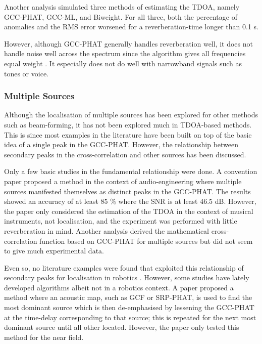 \documentclass{report}
\begin{document}
Another analysis \cite{brandstein_robust_1997} simulated three methods of estimating the TDOA, namely GCC-PHAT, GCC-ML, and Biweight. For all three, both the percentage of anomalies and the RMS error worsened for a reverberation-time longer than 0.1 \si{s}.

However, although GCC-PHAT generally handles reverberation well, it does not handle noise well across the spectrum since the algorithm gives all frequencies equal weight \cite{valin_robust_2003}. It especially does not do well with narrowband signals such as tones or voice.

\subsubsection{Multiple Sources}

Although the localisation of multiple sources has been explored for other methods such as beam-forming, it has not been explored much in TDOA-based methods. This is since most examples in the literature have been built on top of the basic idea of a single peak in the GCC-PHAT. However, the relationship between secondary peaks in the cross-correlation and other sources has been discussed.

Only a few basic studies in the fundamental relationship were done. A convention paper \cite{clifford_calculating_2010} proposed a method in the context of audio-engineering where multiple sources manifested themselves as distinct peaks in the GCC-PHAT. The results showed an accuracy of at least 85 \% where the SNR is at least 46.5 \si{dB}. However, the paper only considered the estimation of the TDOA in the context of musical instruments, not localisation, and the experiment was performed with little reverberation in mind. Another analysis \cite{kwon_analysis_2010} derived the mathematical cross-correlation function based on GCC-PHAT for multiple sources but did not seem to give much experimental data. 

Even so, no literature examples were found that exploited this relationship of secondary peaks for localisation in robotics \cite{rascon_localization_2017}. However, some studies have lately developed algorithms albeit not in a robotics context. A paper \cite{brutti_multiple_2010} proposed a method where an acoustic map, such as GCF or SRP-PHAT, is used to find the most dominant source which is then de-emphasised by lessening the GCC-PHAT at the time-delay corresponding to that source; this is repeated for the next most dominant source until all other located. However, the paper only tested this method for the near field.
\end{document}
